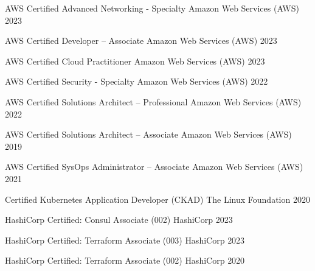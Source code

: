 

\begin{cvhonors}

  \cvhonor
    {AWS Certified Advanced Networking - Specialty} %
    {Amazon Web Services (AWS)} %
    {} %
    {2023} %

  \cvhonor
    {AWS Certified Developer – Associate} %
    {Amazon Web Services (AWS)} %
    {} %
    {2023} %

  \cvhonor
    {AWS Certified Cloud Practitioner} %
    {Amazon Web Services (AWS)} %
    {} %
    {2023} %

  \cvhonor
    {AWS Certified Security - Specialty} %
    {Amazon Web Services (AWS)} %
    {} %
    {2022} %

  \cvhonor
    {AWS Certified Solutions Architect – Professional} %
    {Amazon Web Services (AWS)} %
    {} %
    {2022} %

  \cvhonor
    {AWS Certified Solutions Architect – Associate} %
    {Amazon Web Services (AWS)} %
    {} %
    {2019} %

  \cvhonor
    {AWS Certified SysOps Administrator – Associate} %
    {Amazon Web Services (AWS)} %
    {} %
    {2021} %

  \cvhonor
    {Certified Kubernetes Application Developer (CKAD)} %
    {The Linux Foundation} %
    {} %
    {2020} %

  \cvhonor
    {HashiCorp Certified: Consul Associate (002)} %
    {HashiCorp} %
    {} %
    {2023} %

  \cvhonor
    {HashiCorp Certified: Terraform Associate (003)} %
    {HashiCorp} %
    {} %
    {2023} %

  \cvhonor
    {HashiCorp Certified: Terraform Associate (002)} %
    {HashiCorp} %
    {} %
    {2020} %

\end{cvhonors}
